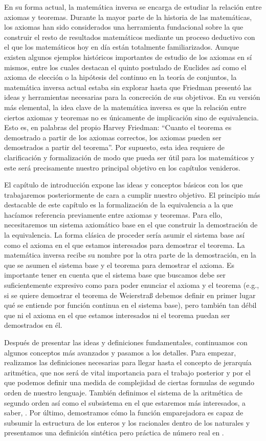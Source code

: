 \documentclass[../main.tex]{memoir}
\begin{document}
En su forma actual, la matemática inversa se encarga de estudiar la relación entre axiomas y teoremas. Durante la mayor parte de la historia de las matemáticas, los axiomas han sido considerados una herramienta fundacional sobre la que construir el resto de resultados matemáticos mediante un proceso deductivo con el que los matemáticos hoy en día están totalmente familiarizados. Aunque existen algunos ejemplos históricos importantes de estudio de los axiomas en sí mismos, entre los cuales destacan el quinto postulado de Euclides así como el axioma de elección o la hipótesis del continuo en la teoría de conjuntos, la matemática inversa actual estaba sin explorar hasta que Friedman presentó las ideas y herramientas necesarias para la concreción de sus objetivos. En su versión más elemental, la idea clave de la matemática inversa es que la relación entre ciertos axiomas y teoremas no es únicamente de implicación sino de equivalencia. Esto es, en palabras del propio Harvey Friedman: ``Cuanto el teorema es demostrado a partir de los axiomas correctos, los axiomas pueden ser demostrados a partir del teorema''. Por supuesto, esta idea requiere de clarificación y formalización de modo que pueda ser útil para los matemáticos y este será precisamente nuestro principal objetivo en los capítulos venideros.

El capítulo de introducción expone las ideas y conceptos básicos con los que trabajaremos posteriormente de cara a cumplir nuestro objetivo. El principio más destacable de este capítulo es la formalización de la equivalencia a la que hacíamos referencia previamente entre axiomas y teoremas. Para ello, necesitaremos un sistema axiomático base en el que construir la demostración de la equivalencia. La forma clásica de proceder sería asumir el sistema base así como el axioma en el que estamos interesados para demostrar el teorema. La matemática inversa recibe su nombre por la otra parte de la demostración, en la que se asumen el sistema base y el teorema para demostrar el axioma. Es importante tener en cuenta que el sistema base que buscamos debe ser suficientemente expresivo como para poder enunciar el axioma y el teorema (e.g., si se quiere demostrar el teorema de Weierstra{\ss} debemos definir en primer lugar qué se entiende por función continua en el sistema base), pero también tan débil que ni el axioma en el que estamos interesados ni el teorema puedan ser demostrados en él.

Después de presentar las ideas y definiciones fundamentales, continuamos con algunos conceptos más avanzados y pasamos a los detalles. Para empezar, realizamos las definiciones necesarias para llegar hasta el concepto de jerarquía aritmética, que nos será de vital importancia para el trabajo posterior y por el que podemos definir una medida de complejidad de ciertas formulas de segundo orden de nuestro lenguaje. También definimos el sistema de la aritmética de segundo orden así como el subsistema en el que estaremos más interesados, a saber, \rca. Por último, demostramos cómo la función emparejadora es capaz de subsumir la estructura de los enteros y los racionales dentro de los naturales y presentamos una definición sintética pero práctica de número real en \rca.
\end{document}
